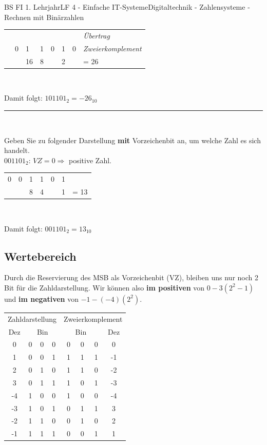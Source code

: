 \documentclass[11pt,twocolumn,oneside,openany,headings=optiontotoc,11pt,numbers=noenddot]{article}
\begin{document}
\begin{worksheet}{BS FI 1. Lehrjahr}{LF 4 - Einfache IT-Systeme}{Digitaltechnik - Zahlensysteme - Rechnen mit Binärzahlen}
\begin{tabularx}{0.48\textwidth}{rllllll|l}
			& & & & & \color{codegray}{\tiny{1}} & & \textit{\tiny{Übertrag}}\normalsize\\
			\cline{1-8}
			& 0 & 1 & 1 & 0 & 1 & 0 & \textit{Zweierkomplement}\\
			& & 16 & 8 &  & 2 & & = 26
		\end{tabularx}\\
		\par\noindent
		Damit folgt: \(101101_2 = -26_{10}\)\\
		\par\noindent
		\rule{0.48\textwidth}{0.1pt}\\
		\par\noindent
		Geben Sie zu folgender Darstellung \textbf{mit} Vorzeichenbit an, um welche Zahl es sich handelt.\\
		\colorbox{green!10}{\(0\)}\(01101_{2}\): \(VZ = 0 \Rightarrow \) positive Zahl.\\
		\par\noindent
		\begin{tabularx}{0.48\textwidth}{llllllr}
			0 & 0 & 1 & 1 & 0 & 1\\
			& & 8 & 4 & & 1 & = 13
		\end{tabularx}\\
		\par\noindent
		Damit folgt: \(001101_2 = 13_{10}\)\\
		\subsection{Wertebereich}
		Durch die Reservierung des MSB als Vorzeichenbit (VZ), bleiben uns nur noch 2 Bit für die Zahldarstellung. Wir können also \textbf{im positiven} von \(0 - 3 (2^2-1)\) und \textbf{im negativen} von \(-1 - (-4) (2^2)\).\\
		\par\noindent
		\begin{tabularx}{0.48\textwidth}{c|lll||rrr|c}
			\multicolumn{4}{c||}{Zahldarstellung} & \multicolumn{4}{c}{Zweierkomplement}\\
			Dez & \multicolumn{3}{c||}{Bin} & \multicolumn{3}{c}{Bin} & Dez\\
			\cline{1-8}
			0 & 0 & 0 & 0 & 0 & 0 & 0 & 0\\
			1 & 0 & 0 & 1 & 1 & 1 & 1 & -1\\
			2 & 0 & 1 & 0 & 1 & 1 & 0 & -2\\
			3 & 0 & 1 & 1 & 1 & 0 & 1 & -3\\
			-4 & 1 & 0 & 0 & 1 & 0 & 0 & -4\\
			-3 & 1 & 0 & 1 & 0 & 1 & 1 & 3\\
			-2 & 1 & 1 & 0 & 0 & 1 & 0 & 2\\
			-1 & 1 & 1 & 1 & 0 & 0 & 1 & 1
			

\end{tabularx}
\end{worksheet}
\end{document}
